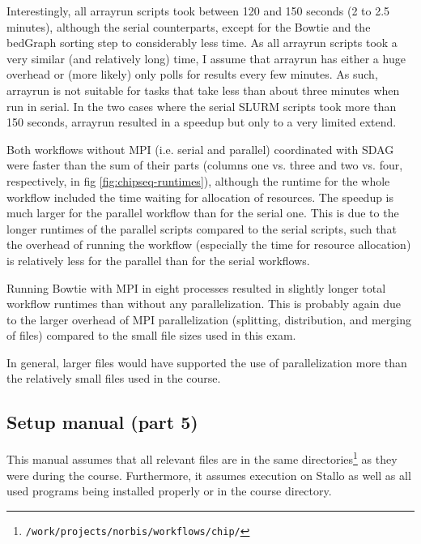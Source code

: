 \documentclass[paper=a4, 12pt]{scrartcl}
\begin{document}
Interestingly, all arrayrun scripts took between 120 and 150 seconds (2 to 2.5 minutes), although the serial counterparts, except for the Bowtie and the bedGraph sorting step to considerably less time. As all arrayrun scripts took a very similar (and relatively long) time, I assume that arrayrun has either a huge overhead or (more likely) only polls for results every few minutes. As such, arrayrun is not suitable for tasks that take less than about three minutes when run in serial. In the two cases where the serial SLURM scripts took more than 150 seconds, arrayrun resulted in a speedup but only to a very limited extend.

Both workflows without MPI (i.e. serial and parallel) coordinated with SDAG were faster than the sum of their parts (columns one vs. three and two vs. four, respectively, in fig \ref{fig:chipseq-runtimes}), although the runtime for the whole workflow included the time waiting for allocation of resources. The speedup is much larger for the parallel workflow than for the serial one. This is due to the longer runtimes of the parallel scripts compared to the serial scripts, such that the overhead of running the workflow (especially the time for resource allocation) is relatively less for the parallel than for the serial workflows.

Running Bowtie with MPI in eight processes resulted in slightly longer total workflow runtimes than without any parallelization. This is probably again due to the larger overhead of MPI parallelization (splitting, distribution, and merging of files) compared to the small file sizes used in this exam.

In general, larger files would have supported the use of parallelization more than the relatively small files used in the course.

\subsection{Setup manual (part 5)}

This manual assumes that all relevant files are in the same directories\footnote{\texttt{/work/}\allowbreak\texttt{projects/}\texttt{norbis/}\allowbreak\texttt{workflows/}\allowbreak\texttt{chip/}} as they were during the course. Furthermore, it assumes execution on Stallo as well as all used programs being installed properly or in the course directory.
\end{document}
